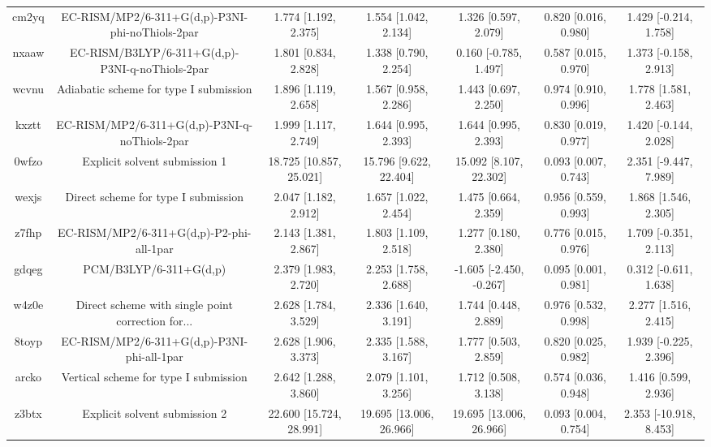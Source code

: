 \documentclass{article}
\begin{document}
\begin{center}
\begin{longtable}{|ccccccc|}
 cm2yq &    EC-RISM/MP2/6-311+G(d,p)-P3NI-phi-noThiols-2par &     1.774 [1.192, 2.375] &     1.554 [1.042, 2.134] &     1.326 [0.597, 2.079] &  0.820 [0.016, 0.980] &   1.429 [-0.214, 1.758] \\
 nxaaw &    EC-RISM/B3LYP/6-311+G(d,p)-P3NI-q-noThiols-2par &     1.801 [0.834, 2.828] &     1.338 [0.790, 2.254] &    0.160 [-0.785, 1.497] &  0.587 [0.015, 0.970] &   1.373 [-0.158, 2.913] \\
 wcvnu &             Adiabatic scheme for type I submission &     1.896 [1.119, 2.658] &     1.567 [0.958, 2.286] &     1.443 [0.697, 2.250] &  0.974 [0.910, 0.996] &    1.778 [1.581, 2.463] \\
 kxztt &      EC-RISM/MP2/6-311+G(d,p)-P3NI-q-noThiols-2par &     1.999 [1.117, 2.749] &     1.644 [0.995, 2.393] &     1.644 [0.995, 2.393] &  0.830 [0.019, 0.977] &   1.420 [-0.144, 2.028] \\
 0wfzo &                      Explicit solvent submission 1 &  18.725 [10.857, 25.021] &   15.796 [9.622, 22.404] &   15.092 [8.107, 22.302] &  0.093 [0.007, 0.743] &   2.351 [-9.447, 7.989] \\
 wexjs &                Direct scheme for type I submission &     2.047 [1.182, 2.912] &     1.657 [1.022, 2.454] &     1.475 [0.664, 2.359] &  0.956 [0.559, 0.993] &    1.868 [1.546, 2.305] \\
 z7fhp &           EC-RISM/MP2/6-311+G(d,p)-P2-phi-all-1par &     2.143 [1.381, 2.867] &     1.803 [1.109, 2.518] &     1.277 [0.180, 2.380] &  0.776 [0.015, 0.976] &   1.709 [-0.351, 2.113] \\
 gdqeg &                             PCM/B3LYP/6-311+G(d,p) &     2.379 [1.983, 2.720] &     2.253 [1.758, 2.688] &  -1.605 [-2.450, -0.267] &  0.095 [0.001, 0.981] &   0.312 [-0.611, 1.638] \\
 w4z0e &  Direct scheme with single point correction for... &     2.628 [1.784, 3.529] &     2.336 [1.640, 3.191] &     1.744 [0.448, 2.889] &  0.976 [0.532, 0.998] &    2.277 [1.516, 2.415] \\
 8toyp &         EC-RISM/MP2/6-311+G(d,p)-P3NI-phi-all-1par &     2.628 [1.906, 3.373] &     2.335 [1.588, 3.167] &     1.777 [0.503, 2.859] &  0.820 [0.025, 0.982] &   1.939 [-0.225, 2.396] \\
 arcko &              Vertical scheme for type I submission &     2.642 [1.288, 3.860] &     2.079 [1.101, 3.256] &     1.712 [0.508, 3.138] &  0.574 [0.036, 0.948] &    1.416 [0.599, 2.936] \\
 z3btx &                      Explicit solvent submission 2 &  22.600 [15.724, 28.991] &  19.695 [13.006, 26.966] &  19.695 [13.006, 26.966] &  0.093 [0.004, 0.754] &  2.353 [-10.918, 8.453] \\

\end{longtable}
\end{center}
\end{document}
